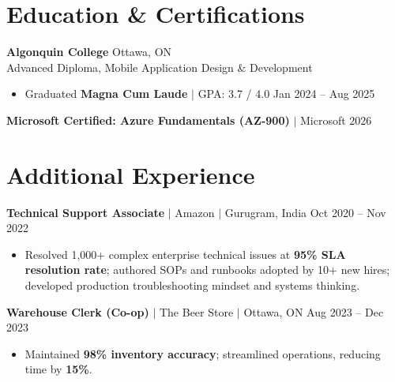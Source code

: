 \documentclass[11pt,a4paper]{article}
\begin{document}
\section{Education \& Certifications}

\textbf{Algonquin College} \hfill Ottawa, ON \\
Advanced Diploma, Mobile Application Design \& Development
\begin{itemize}
    \item Graduated \textbf{Magna Cum Laude} $|$ GPA: 3.7 / 4.0 \hfill Jan 2024 -- Aug 2025
\end{itemize}
\textbf{Microsoft Certified: Azure Fundamentals (AZ-900)} $|$ Microsoft \hfill 2026

\section{Additional Experience}

\textbf{Technical Support Associate} $|$ Amazon $|$ Gurugram, India \hfill Oct 2020 -- Nov 2022
\begin{itemize}
    \item Resolved 1,000+ complex enterprise technical issues at \textbf{95\% SLA resolution rate}; authored SOPs and runbooks adopted by 10+ new hires; developed production troubleshooting mindset and systems thinking.
\end{itemize}

\vspace{4pt}

\textbf{Warehouse Clerk (Co-op)} $|$ The Beer Store $|$ Ottawa, ON \hfill Aug 2023 -- Dec 2023
\begin{itemize}
    \item Maintained \textbf{98\% inventory accuracy}; streamlined operations, reducing time by \textbf{15\%}.
\end{itemize}
\end{document}
